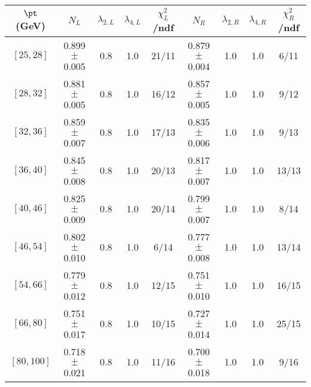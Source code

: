 \begin{tabular}{c||c|c|c|c||c|c|c|c}
$\pt$ (GeV) & $N_L$ & $\lambda_{2,L}$ & $\lambda_{4,L}$  & $\chi^2_L$/ndf & $N_R$ & $\lambda_{2,R}$ & $\lambda_{4,R}$  & $\chi^2_R$/ndf \\
\hline
$[25, 28]$ & 0.899$\pm$0.005 & 0.8 & 1.0 & 21/11 & 0.879$\pm$0.004 & 1.0 & 1.0 & 6/11\\
$[28, 32]$ & 0.881$\pm$0.005 & 0.8 & 1.0 & 16/12 & 0.857$\pm$0.005 & 1.0 & 1.0 & 9/12\\
$[32, 36]$ & 0.859$\pm$0.007 & 0.8 & 1.0 & 17/13 & 0.835$\pm$0.006 & 1.0 & 1.0 & 9/13\\
$[36, 40]$ & 0.845$\pm$0.008 & 0.8 & 1.0 & 20/13 & 0.817$\pm$0.007 & 1.0 & 1.0 & 13/13\\
$[40, 46]$ & 0.825$\pm$0.009 & 0.8 & 1.0 & 20/14 & 0.799$\pm$0.007 & 1.0 & 1.0 & 8/14\\
$[46, 54]$ & 0.802$\pm$0.010 & 0.8 & 1.0 & 6/14 & 0.777$\pm$0.008 & 1.0 & 1.0 & 13/14\\
$[54, 66]$ & 0.779$\pm$0.012 & 0.8 & 1.0 & 12/15 & 0.751$\pm$0.010 & 1.0 & 1.0 & 16/15\\
$[66, 80]$ & 0.751$\pm$0.017 & 0.8 & 1.0 & 10/15 & 0.727$\pm$0.014 & 1.0 & 1.0 & 25/15\\
$[80, 100]$ & 0.718$\pm$0.021 & 0.8 & 1.0 & 11/16 & 0.700$\pm$0.018 & 1.0 & 1.0 & 9/16\\
\end{tabular}
